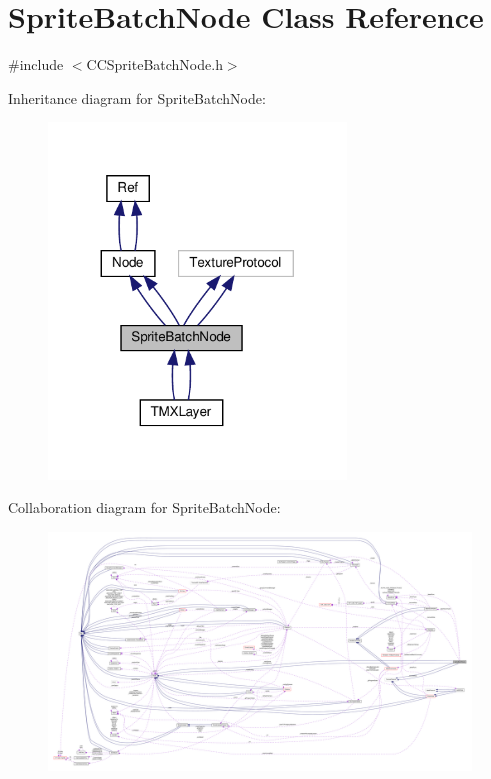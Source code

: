 \hypertarget{classSpriteBatchNode}{}\section{Sprite\+Batch\+Node Class Reference}
\label{classSpriteBatchNode}


{\ttfamily \#include $<$C\+C\+Sprite\+Batch\+Node.\+h$>$}



Inheritance diagram for Sprite\+Batch\+Node\+:
\nopagebreak
\begin{figure}[H]
\begin{center}
\leavevmode
\includegraphics[width=224pt]{classSpriteBatchNode__inherit__graph}
\end{center}
\end{figure}


Collaboration diagram for Sprite\+Batch\+Node\+:
\nopagebreak
\begin{figure}[H]
\begin{center}
\leavevmode
\includegraphics[width=350pt]{classSpriteBatchNode__coll__graph}
\end{center}
\end{figure}
